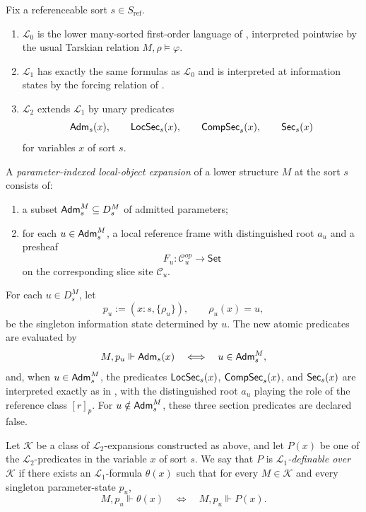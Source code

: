 \begin{definition}\label{def:lower-enriched-languages}
Fix a referenceable sort $s\in S_{\mathrm{ref}}$.
\begin{enumerate}[label=(\roman*),nosep]
\item $\mathcal L_0$ is the lower many-sorted first-order language of , interpreted pointwise by the usual Tarskian relation $M,\rho\models\varphi$.
\item $\mathcal L_1$ has exactly the same formulas as $\mathcal L_0$ and is interpreted at information states by the forcing relation of .
\item $\mathcal L_2$ extends $\mathcal L_1$ by unary predicates
\[
\mathsf{Adm}_s(x),\qquad \mathsf{LocSec}_s(x),\qquad \mathsf{CompSec}_s(x),\qquad \mathsf{Sec}_s(x)
\]
for variables $x$ of sort $s$.
\end{enumerate}

A \emph{parameter-indexed local-object expansion} of a lower structure $M$ at the sort $s$ consists of:
\begin{enumerate}[label=(\alph*),nosep]
\item a subset $\mathsf{Adm}_s^M\subseteq D_s^M$ of admitted parameters;
\item for each $u\in \mathsf{Adm}_s^M$, a local reference frame with distinguished root $a_u$ and a presheaf
\[
F_u:\mathcal C_u^{op}\to\mathsf{Set}
\]
on the corresponding slice site $\mathcal C_u$.
\end{enumerate}
For each $u\in D_s^M$, let
\[
p_u:=(x:s,\{\rho_u\}),
\qquad
\rho_u(x)=u,
\]
be the singleton information state determined by $u$. The new atomic predicates are evaluated by
\[
M,p_u\Vdash \mathsf{Adm}_s(x)
\quad\Longleftrightarrow\quad
u\in \mathsf{Adm}_s^M,
\]
and, when $u\in \mathsf{Adm}_s^M$, the predicates $\mathsf{LocSec}_s(x)$, $\mathsf{CompSec}_s(x)$, and $\mathsf{Sec}_s(x)$ are interpreted exactly as in , with the distinguished root $a_u$ playing the role of the reference class $[r]_p$. For $u\notin\mathsf{Adm}_s^M$, these three section predicates are declared false.
\end{definition}

\begin{definition}\label{def:information-state-definability}
Let $\mathcal{K}$ be a class of $\mathcal{L}_2$-expansions constructed as above, and let $P(x)$ be one of the $\mathcal{L}_2$-predicates in the variable $x$ of sort $s$. We say that $P$ is \emph{$\mathcal{L}_1$-definable over $\mathcal{K}$} if there exists an $\mathcal{L}_1$-formula $\theta(x)$ such that for every $M\in\mathcal{K}$ and every singleton parameter-state $p_u$,
\[
M,p_u\Vdash \theta(x)
\quad\Longleftrightarrow\quad
M,p_u\Vdash P(x).
\]
\end{definition}

